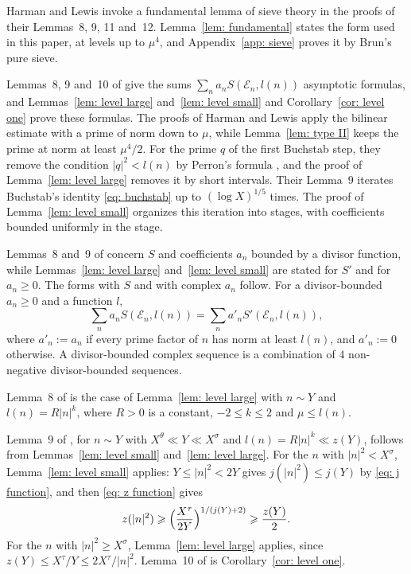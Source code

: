 \documentclass{article}
\numberwithin{equation}{section}
\newcommand{\Le}{\leqslant}
\newcommand{\Ge}{\geqslant}
\begin{document}
Harman and Lewis invoke a fundamental lemma of sieve theory in the proofs of their Lemmas~8, 9, 11 and~12. Lemma~\ref{lem: fundamental} states the form used in this paper, at levels up to $\mu^4$, and Appendix~\ref{app: sieve} proves it by Brun's pure sieve.

Lemmas~8, 9 and~10 of \citet{harman2001gaussian} give the sums $\sum_n a_n S(\mathcal{E}_n, l(n))$ asymptotic formulas, and Lemmas~\ref{lem: level large} and~\ref{lem: level small} and Corollary~\ref{cor: level one} prove these formulas. The proofs of Harman and Lewis apply the bilinear estimate with a prime of norm down to $\mu$, while Lemma~\ref{lem: type II} keeps the prime at norm at least $\mu^4/2$. For the prime $q$ of the first Buchstab step, they remove the condition $|q|^2 < l(n)$ by Perron's formula \citep[p.~128]{harman2001gaussian}, and the proof of Lemma~\ref{lem: level large} removes it by short intervals. Their Lemma~9 iterates Buchstab's identity \eqref{eq: buchstab} up to $(\log X)^{1/5}$ times. The proof of Lemma~\ref{lem: level small} organizes this iteration into stages, with coefficients bounded uniformly in the stage.

Lemmas~8 and~9 of \citet{harman2001gaussian} concern $S$ and coefficients $a_n$ bounded by a divisor function, while Lemmas~\ref{lem: level large} and~\ref{lem: level small} are stated for $S'$ and for $a_n \Ge 0$. The forms with $S$ and with complex $a_n$ follow. For a divisor-bounded $a_n \Ge 0$ and a function $l$,
\begin{equation*}
\sum_n a_n S(\mathcal{E}_n, l(n)) = \sum_n a'_n S'(\mathcal{E}_n, l(n)),
\end{equation*}
where $a'_n := a_n$ if every prime factor of $n$ has norm at least $l(n)$, and $a'_n := 0$ otherwise. A divisor-bounded complex sequence is a combination of $4$ non-negative divisor-bounded sequences.

Lemma~8 of \citet{harman2001gaussian} is the case of Lemma~\ref{lem: level large} with $n \sim Y$ and $l(n) = R|n|^k$, where $R > 0$ is a constant, $-2 \Le k \Le 2$ and $\mu \Le l(n)$.

Lemma~9 of \citet{harman2001gaussian}, for $n \sim Y$ with $X^{\theta} \ll Y \ll X^{\sigma}$ and $l(n) = R|n|^k \ll z(Y)$, follows from Lemmas~\ref{lem: level small} and~\ref{lem: level large}. For the $n$ with $|n|^2 < X^{\sigma}$, Lemma~\ref{lem: level small} applies: $Y \Le |n|^2 < 2Y$ gives $j(|n|^2) \Le j(Y)$ by \eqref{eq: j function}, and then \eqref{eq: z function} gives
\begin{equation*}
z(|n|^2) \Ge \Bigl( \frac{X^{\tau}}{2Y} \Bigr)^{1/(j(Y)+2)} \Ge \frac{z(Y)}{2}.
\end{equation*} For the $n$ with $|n|^2 \Ge X^{\sigma}$, Lemma~\ref{lem: level large} applies, since $z(Y) \Le X^{\tau}/Y \Le 2X^{\tau}/|n|^2$. Lemma~10 of \citet{harman2001gaussian} is Corollary~\ref{cor: level one}.
\end{document}

